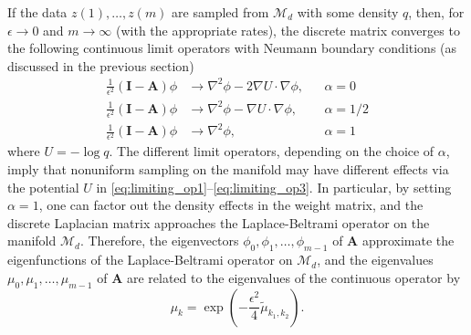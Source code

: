 \documentclass[3p]{elsarticle}
\begin{document}
If the data $z(1), \dots, z(m)$ are sampled from $\mathcal{M}_d$ with some density $q$, then, for $\epsilon \rightarrow 0$ and $m \rightarrow \infty$ (with the appropriate rates), the discrete matrix converges to the following continuous limit operators with Neumann boundary conditions (as discussed in the previous section) \cite{coifman2006geometric}
\begin{align} 
\label{eq:limiting_op1}
\frac{1}{\epsilon^2}(\mathbf{I}-\mathbf{A}) \phi &\rightarrow \nabla^2 \phi - 2\nabla U \cdot \nabla \phi, &&\alpha = 0 \\
\label{eq:limiting_op2}
\frac{1}{\epsilon^2}(\mathbf{I}-\mathbf{A}) \phi &\rightarrow \nabla^2 \phi - \nabla U \cdot \nabla \phi, &&\alpha = 1/2 \\
\label{eq:limiting_op3}
\frac{1}{\epsilon^2}(\mathbf{I}-\mathbf{A}) \phi &\rightarrow \nabla^2 \phi, &&\alpha = 1
\end{align}
where $U = - \log q$.
%
The different limit operators, depending on the choice of $\alpha$, imply that nonuniform
sampling on the manifold may have different effects via the potential $U$ in \eqref{eq:limiting_op1}--\eqref{eq:limiting_op3}.
%
In particular, by setting $\alpha=1$, one can factor out the density effects in the
weight matrix, and the discrete Laplacian matrix approaches the Laplace-Beltrami operator on the manifold $\mathcal{M}_d$.
%
Therefore, the eigenvectors $\phi_0, \phi_1, \dots, \phi_{m-1}$ of $\mathbf{A}$ approximate the eigenfunctions of the Laplace-Beltrami operator on $\mathcal{M}_d$,
and the eigenvalues $\mu_0, \mu_1, \dots, \mu_{m-1}$ of $\mathbf{A}$ are related to the eigenvalues of the continuous operator by
\begin{equation} \label{eq:evals_relationship}
\mu_k = \exp \left( -\frac{\epsilon^2}{4} \tilde{\mu}_{k_1, k_2}  \right).
\end{equation}
\end{document}
